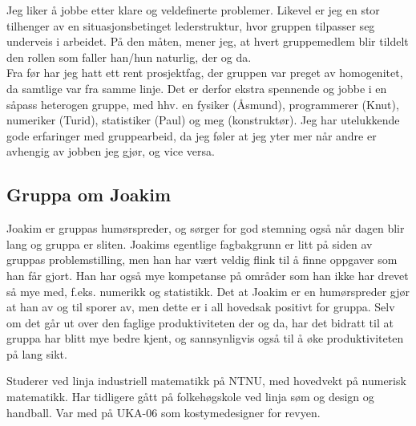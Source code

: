 Jeg liker å jobbe etter klare og veldefinerte problemer. Likevel
er jeg en stor tilhenger av en situasjonsbetinget lederstruktur, hvor gruppen
tilpasser seg underveis i arbeidet. På den måten, mener jeg, at hvert
gruppemedlem blir tildelt den rollen som faller han/hun naturlig, der og da.\\ 

Fra før har jeg hatt ett rent prosjektfag, der  gruppen var preget av
homogenitet, da samtlige var fra samme linje. Det er derfor ekstra spennende og
jobbe i en såpass heterogen gruppe, med hhv. en fysiker (Åsmund), programmerer
(Knut), numeriker (Turid), statistiker (Paul) og meg (konstruktør). Jeg har
utelukkende gode erfaringer med gruppearbeid, da jeg føler at jeg yter mer når
andre er avhengig av jobben jeg gjør, og vice versa.


\subsection*{Gruppa om Joakim}
Joakim er gruppas humørspreder, og sørger for god stemning også når dagen blir
lang og gruppa er sliten. Joakims egentlige fagbakgrunn er litt på siden av
gruppas problemstilling, men han har vært veldig flink til å finne oppgaver som
han får gjort. Han har også mye kompetanse på områder som han ikke har drevet så
mye med, f.eks. numerikk og statistikk. Det at Joakim er en humørspreder gjør at 
han av og til sporer av, men dette er i all hovedsak positivt for gruppa. Selv om 
det går ut over den faglige produktiviteten der og da, har det bidratt til at 
gruppa har blitt mye bedre kjent, og sannsynligvis også til å øke produktiviteten 
på lang sikt.

Studerer ved linja industriell matematikk på NTNU, med hovedvekt på numerisk matematikk. Har tidligere gått på folkehøgskole ved linja søm og design og handball. Var med på UKA-06 som kostymedesigner for revyen.

